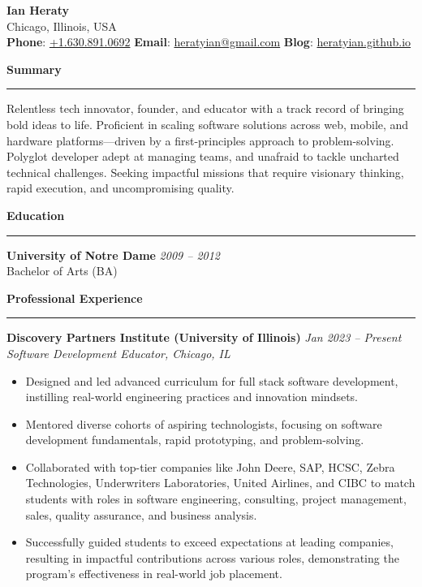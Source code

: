 \documentclass[letterpaper,10pt]{article}
\newcommand{\resheading}[1]{
  \vspace{10pt}
  \textbf{\large #1}
  \vspace{5pt}
  \hrule
  \vspace{5pt}
}
\begin{document}
\begin{center}
    {\LARGE \textbf{Ian Heraty}} \\
    Chicago, Illinois, USA \\
    \textbf{Phone}: \href{tel:+1.630.891.0692}{+1.630.891.0692} \quad\textbullet\quad 
    \textbf{Email}: \href{mailto:heratyian@gmail.com}{heratyian@gmail.com} \quad\textbullet\quad
    \textbf{Blog}: \href{http://heratyian.github.io}{heratyian.github.io}
\end{center}

\resheading{Summary}
Relentless tech innovator, founder, and educator with a track record of 
bringing bold ideas to life. Proficient in scaling software solutions across 
web, mobile, and hardware platforms—driven by a first-principles approach 
to problem-solving. Polyglot developer adept at 
managing teams, and unafraid to tackle uncharted technical challenges. 
Seeking impactful missions that require visionary thinking, rapid execution, 
and uncompromising quality.

\resheading{Education}
\textbf{University of Notre Dame} \hfill \textit{2009 -- 2012}\\
Bachelor of Arts (BA)

\resheading{Professional Experience}

\textbf{Discovery Partners Institute (University of Illinois)} \hfill \textit{Jan 2023 -- Present}\\
\emph{Software Development Educator, Chicago, IL}\\
\begin{itemize}
  \item Designed and led advanced curriculum for full stack software development, 
        instilling real-world engineering practices and innovation mindsets.
  \item Mentored diverse cohorts of aspiring technologists, focusing on 
        software development fundamentals, rapid prototyping, and problem-solving.
  \item Collaborated with top-tier companies like John Deere, SAP, HCSC, 
        Zebra Technologies, Underwriters Laboratories, United Airlines, and CIBC to 
        match students with roles in software engineering, consulting, project 
        management, sales, quality assurance, and business analysis.
  \item Successfully guided students to exceed expectations at leading companies, 
        resulting in impactful contributions across various roles, demonstrating the 
        program's effectiveness in real-world job placement.
\end{itemize}
\end{document}
